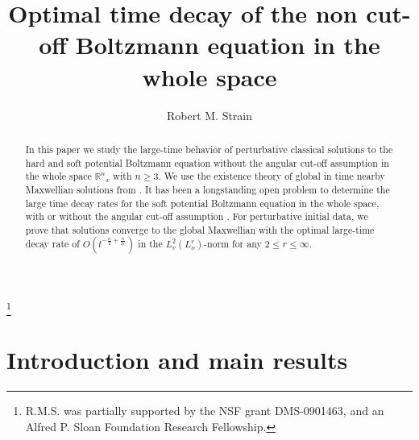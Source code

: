 \documentclass{amsart}
\numberwithin{equation}{section}
\begin{document}
\title[Optimal time decay of the Boltzmann equation in ${{\mathbb R}^{n}}_x$]
{Optimal time decay of the non cut-off Boltzmann equation in the whole space}

\author[R. M. Strain]{Robert M. Strain}
\address{
University of Pennsylvania, Department of Mathematics, David Rittenhouse Lab, 209 South 33rd Street, Philadelphia, PA 19104-6395, USA}
\thanks{R.M.S. was partially supported by the NSF grant DMS-0901463, and an Alfred P. Sloan Foundation Research Fellowship.	}

\begin{abstract}
In this paper we study the large-time behavior of perturbative classical solutions to the hard and soft potential Boltzmann equation without the angular cut-off assumption in the whole space ${{\mathbb R}^{n}}_x$ with ${{n} \ge 3}$.    We use the existence theory of global in time nearby Maxwellian solutions from \cite{gsNonCutA,gsNonCut0}.  
It has been a longstanding open problem to determine the large time decay rates for the soft potential Boltzmann equation in the whole space, with or without the angular cut-off assumption \cite{MR677262,MR2847536}.  For perturbative initial data, we prove that solutions converge to the global Maxwellian with the optimal large-time decay rate of  $O(t^{-\frac{n}{2}+\frac{n}{2r}})$ in the $L^2_{v}(L^r_x)$-norm for any $2\leq r\leq \infty$. 
\end{abstract}


\setcounter{tocdepth}{1}
\maketitle
\tableofcontents

\thispagestyle{empty}

\section{Introduction and main results}
\end{document}
